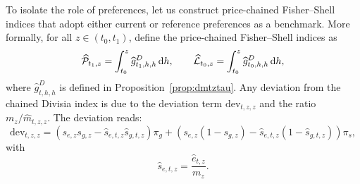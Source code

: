 \documentclass[12pt,a4paper]{article}
\newcommand{\red}[1]{\textcolor{red}{#1}} %
\begin{document}
To isolate the role of preferences, let us construct price-chained Fisher--Shell indices that adopt either current or reference preferences as a benchmark.  
More formally, for all \( z \in (t_0, t_1) \), define the price-chained Fisher--Shell indices as
\[
\widehat{\cal P}_{t_1,z} = \int_{t_0}^z \widehat{g}^D_{t_1,h,h} \, \mathrm{d}h, 
\qquad 
\widehat{\cal L}_{t_0,z} = \int_{t_0}^z \widehat{g}^D_{t_0,h,h} \, \mathrm{d}h,
\]
where \( \widehat{g}^D_{t,h,h} \) is defined in Proposition~\ref{prop:dmtztau}.  
Any deviation from the chained Divisia index is due to the deviation term \( \text{dev}_{t,z,z} \) and the ratio \( m_z / \widehat{m}_{t,z,z} \).  
The deviation reads:
\[
\text{dev}_{t,z,z} 
= \left(s_{e,z}s_{g,z} - \widehat{s}_{e,t,z} \widehat{s}_{g,t,z} \right) \pi_g
+ \left(s_{e,z}(1-s_{g,z}) - \widehat{s}_{e,t,z}(1-\widehat{s}_{g,t,z}) \right) \pi_s,
\]
with
\[
\widehat{s}_{e,t,z} = \frac{\widehat{e}_{t,z}}{m_z}.
\]




\end{document}
